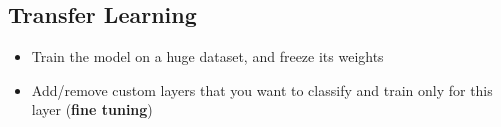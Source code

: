 \subsection{Transfer Learning}
\begin{itemize}
	\item Train the model on a huge dataset, and freeze its weights
	\item Add/remove custom layers that you want to classify and train only for this layer (\textbf{fine tuning})
\end{itemize}
